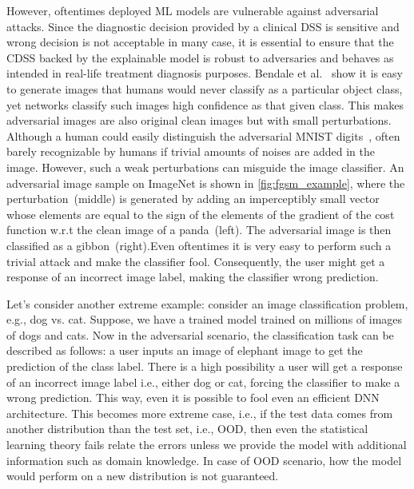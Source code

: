 \hspace*{3.5mm} However, oftentimes deployed ML models are vulnerable against adversarial attacks. Since the diagnostic decision provided by a clinical DSS is sensitive and wrong decision is not acceptable in many case, it is essential to ensure that the CDSS backed by the explainable model is robust to adversaries and behaves as intended in real-life treatment diagnosis purposes. Bendale et al.~\cite{OOD18} show it is easy to generate images that humans would never classify as a particular object class, yet networks classify such images high confidence as that given class. This makes adversarial images are also original clean images but with small perturbations. Although a human could easily distinguish the adversarial MNIST digits~\cite{yuan2019adversarial}, often barely recognizable by humans if trivial amounts of noises are added in the image. However, such a weak perturbations can misguide the image classifier. An adversarial image sample on ImageNet is shown in \cref{fig:fgsm_example}, where the perturbation~(middle) is generated by adding an imperceptibly small vector whose elements are equal to the sign of the elements of the gradient of the cost function w.r.t the clean image of a panda~(left). The adversarial image is then classified as a gibbon~(right).Even oftentimes it is very easy to perform such a trivial attack and make the classifier fool. Consequently, the user might get a response of an incorrect image label, making the classifier wrong prediction. 

\hspace*{3.5mm} Let's consider another extreme example: consider an image classification problem, e.g., dog vs. cat. Suppose, we have a trained model trained on millions of images of dogs and cats. Now in the adversarial scenario, the classification task can be described as follows: a user inputs an image of elephant image to get the prediction of the class label. There is a high possibility a user will get a response of an incorrect image label i.e., either dog or cat, forcing the classifier to make a wrong prediction. This way, even it is possible to fool even an efficient DNN architecture. This becomes more extreme case, i.e., if the test data comes from another distribution than the test set, i.e., OOD, then even the statistical learning theory fails relate the errors unless we provide the model with additional information such as domain knowledge. In case of OOD scenario, how the model would perform on a new distribution is not guaranteed. 

